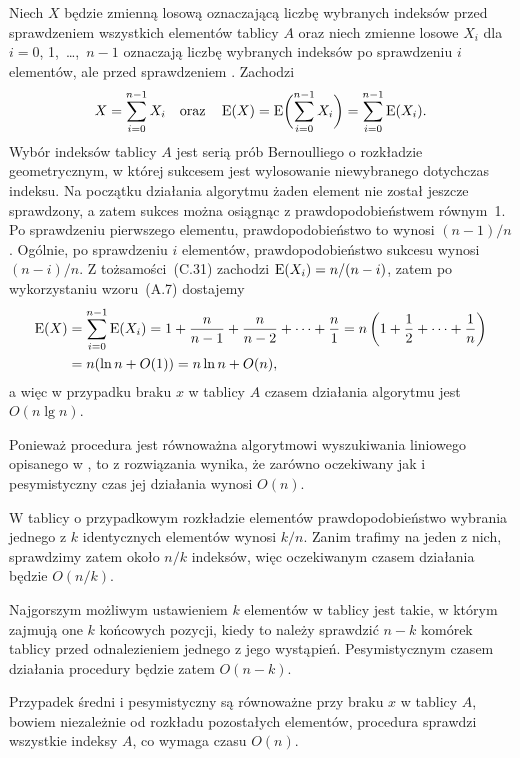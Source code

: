 \subexercise{} %
Niech $X$ będzie zmienną losową oznaczającą liczbę wybranych indeksów przed sprawdzeniem wszystkich elementów tablicy $A$ oraz niech zmienne losowe $X_i$ dla $i=0$, 1,~\dots,~$n-1$ oznaczają liczbę wybranych indeksów po sprawdzeniu $i$ elementów, ale przed sprawdzeniem . Zachodzi
\[
	X = \sum_{i=0}^{n-1}X_i \quad\text{oraz}\quad \operatorname{E}(X) = \operatorname{E}\biggl(\sum_{i=0}^{n-1}X_i\biggr) = \sum_{i=0}^{n-1}\operatorname{E}(X_i).
\]
Wybór indeksów tablicy $A$ jest serią prób Bernoulliego o rozkładzie geometrycznym, w której sukcesem jest wylosowanie niewybranego dotychczas indeksu. Na początku działania algorytmu żaden element nie został jeszcze sprawdzony, a zatem sukces można osiągnąc z prawdopodobieństwem równym~1. Po sprawdzeniu pierwszego elementu, prawdopodobieństwo to wynosi $(n-1)/n$. Ogólnie, po sprawdzeniu $i$ elementów, prawdopodobieństwo sukcesu wynosi $(n-i)/n$. Z tożsamości~(C.31) zachodzi $\operatorname{E}(X_i)=n/(n-i)$, zatem po wykorzystaniu wzoru~(A.7) dostajemy
\begin{align*}
	\operatorname{E}(X) &= \sum_{i=0}^{n-1}\operatorname{E}(X_i) = 1+\frac{n}{n-1}+\frac{n}{n-2}+\dots+\frac{n}{1} = n\left(1+\frac{1}{2}+\dots+\frac{1}{n}\right) \\
	&= n(\ln n+O(1)) = n\ln n+O(n),
\end{align*}
a więc w przypadku braku $x$ w tablicy $A$ czasem działania algorytmu  jest $O(n\lg n)$.

\subexercise{} %
Ponieważ procedura  jest równoważna algorytmowi wyszukiwania liniowego opisanego w , to z rozwiązania  wynika, że zarówno oczekiwany jak i pesymistyczny czas jej działania wynosi $O(n)$.

\subexercise{} %
W tablicy  o przypadkowym rozkładzie elementów prawdopodobieństwo wybrania jednego z $k$ identycznych elementów wynosi $k/n$. Zanim trafimy na jeden z nich, sprawdzimy zatem około $n/k$ indeksów, więc oczekiwanym czasem działania będzie $O(n/k)$.

Najgorszym możliwym ustawieniem $k$ elementów w tablicy  jest takie, w którym zajmują one $k$ końcowych pozycji, kiedy to należy sprawdzić $n-k$ komórek tablicy przed odnalezieniem jednego z jego wystąpień. Pesymistycznym czasem działania procedury będzie zatem $O(n-k)$.

\subexercise{} %
Przypadek średni i pesymistyczny są równoważne przy braku $x$ w tablicy $A$, bowiem niezależnie od rozkładu pozostałych elementów, procedura sprawdzi wszystkie indeksy $A$, co wymaga czasu $O(n)$.

